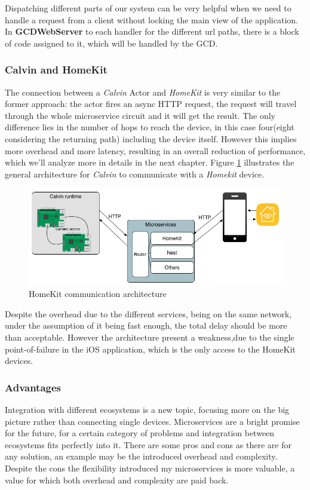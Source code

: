 Dispatching different parts of our system can be very helpful when we need to handle
a request from a client without locking the main view of the application. In \textbf{GCDWebServer}
to each handler for the different url paths, there is a block of code assigned to it,
which will be handled by the GCD.


\subsubsection{Calvin and HomeKit}

The connection between a \textit{Calvin} Actor and \textit{HomeKit} is very similar
to the former approach: the actor fires an async HTTP request, the request will travel
through the whole microservice circuit and it will get the result. \newline
The only difference lies in the number of hops to reach the device, in this case
four(eight considering the returning path) including the device itself. However this
implies more overhead and more latency, resulting in an overall reduction of performance,
which we'll analyze more in details in the next chapter.
Figure \ref{fig:arch-homekit} illustrates the general architecture for \textit{Calvin}
to communicate with a \textit{Homekit} device.
\begin{figure}[h]
\caption{HomeKit communication architecture}
\label{fig:arch-homekit}
\centering
\includegraphics[scale=0.5]{arch2.png}
\end{figure}

Despite the overhead due to the different services, being on the same network, under the
assumption of it being fast enough, the total delay should be more than acceptable.
However the architecture present a weakness,due to the single point-of-failure in the
iOS application, which is the only access to the HomeKit devices.



\subsubsection{Advantages}

Integration with different ecosystems is a new topic, focusing more on the big
picture rather than connecting single devices. Microservices are a bright promise
for the future, for a certain category of problems and integration between ecosystems
fits perfectly into it. There are some pros and cons as there are for any solution,
an example may be the introduced overhead and complexity. Despite the cons the flexibility
introduced my microservices is more valuable, a value for which both overhead and complexity
are paid back.
